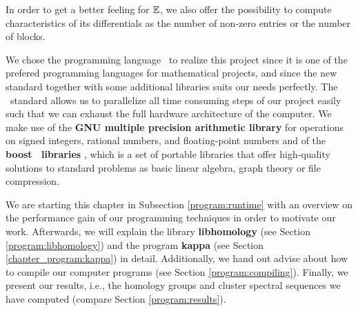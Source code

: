 In order to get a better feeling for $\mathbb E$, we also offer the possibility to compute characteristics of its differentials as the number of non-zero entries or the number of blocks.

We chose the programming language \cppeleven\ to realize this project since it is one of the prefered programming languages for mathematical projects, and since the new standard together with some additional libraries suits our needs perfectly.
The \cppeleven\ standard allows us to parallelize all time consuming steps of our project easily
such that we can exhaust the full hardware architecture of the computer.
We make use of the {\bfseries GNU multiple precision arithmetic library} \cite{GMP} for operations on signed integers, rational numbers, and floating-point numbers and
of the {\bfseries boost \cpp\ libraries} \cite{boost}, which is a set of portable libraries that offer high-quality solutions to standard problems as basic linear algebra, graph theory or file compression.

We are starting this chapter in Subsection \ref{program:runtime} with an overview on the performance gain of our programming techniques in order to motivate our work.
Afterwards, we will explain the library {\bfseries libhomology} (see Section \ref{program:libhomology}) and the program {\bfseries kappa} (see Section \ref{chapter_program:kappa}) in detail.
Additionally, we hand out advise about how to compile our computer programs (see Section \ref{program:compiling}).
Finally, we present our results, i.e., the homology groups and cluster spectral sequences we have computed (compare Section \ref{program:results}).







\nocite{Austern2003}
\nocite{Josuttis2012}
\nocite{Stroustrup2013}
